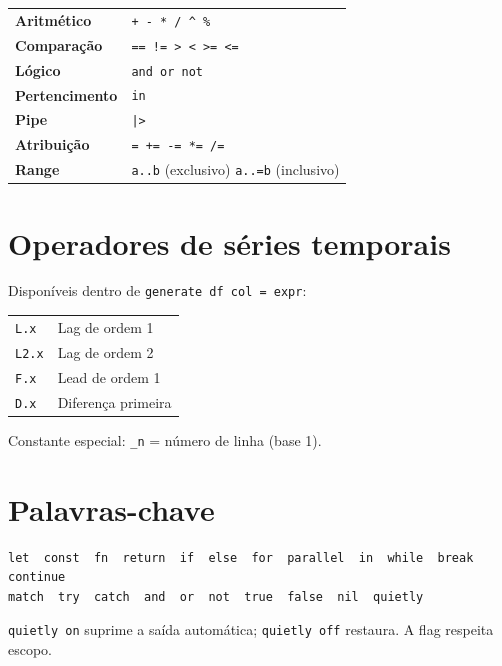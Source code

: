 \begin{center}
\begin{tabular}{ll}
\toprule
\textbf{Aritmético}    & \texttt{+  -  *  /  \^{}  \%} \\
\textbf{Comparação}    & \texttt{== != > < >= <=} \\
\textbf{Lógico}        & \texttt{and  or  not} \\
\textbf{Pertencimento} & \texttt{in} \\
\textbf{Pipe}          & \texttt{|>} \\
\textbf{Atribuição}    & \texttt{=  +=  -=  *=  /=} \\
\textbf{Range}         & \texttt{a..b} (exclusivo) \quad \texttt{a..=b} (inclusivo) \\
\bottomrule
\end{tabular}
\end{center}

\section{Operadores de séries temporais}

Disponíveis dentro de \lstinline{generate df col = expr}:

\begin{center}
\begin{tabular}{ll}
\toprule
\texttt{L.x}   & Lag de ordem 1 \\
\texttt{L2.x}  & Lag de ordem 2 \\
\texttt{F.x}   & Lead de ordem 1 \\
\texttt{D.x}   & Diferença primeira \\
\bottomrule
\end{tabular}
\end{center}

Constante especial: \texttt{\_n} = número de linha (base 1).

\section{Palavras-chave}

\begin{lstlisting}[style=inline, basicstyle=\ttfamily\footnotesize]
let  const  fn  return  if  else  for  parallel  in  while  break  continue
match  try  catch  and  or  not  true  false  nil  quietly
\end{lstlisting}

\lstinline{quietly on} suprime a saída automática; \lstinline{quietly off} restaura. A flag respeita escopo.

